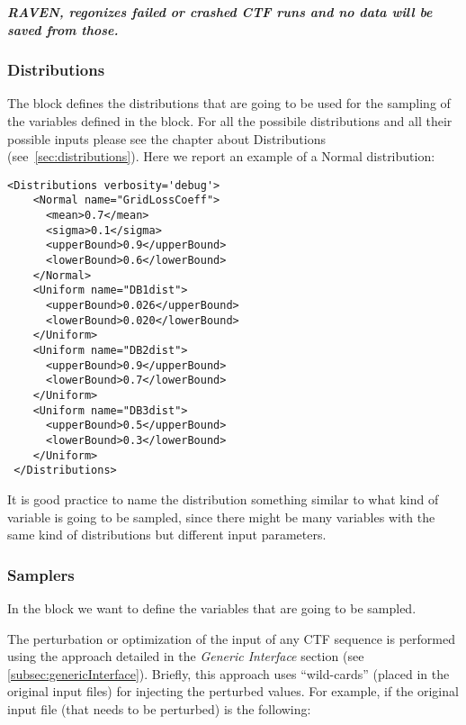 \textbf{\textit{\nb RAVEN, regonizes failed or crashed CTF runs and no data will be saved from those.}}

\subsubsection{Distributions}
The  block defines the distributions that are going
to be used for the sampling of the variables defined in the  block.
%
For all the possibile distributions and all their possible inputs please see the
chapter about Distributions (see~\ref{sec:distributions}).
%
Here we report an example of a Normal distribution:

\begin{lstlisting}[style=XML,morekeywords={name,debug}]
<Distributions verbosity='debug'>
    <Normal name="GridLossCoeff">
      <mean>0.7</mean>
      <sigma>0.1</sigma>
      <upperBound>0.9</upperBound>
      <lowerBound>0.6</lowerBound>
    </Normal>
    <Uniform name="DB1dist">
      <upperBound>0.026</upperBound>
      <lowerBound>0.020</lowerBound>
    </Uniform>
    <Uniform name="DB2dist">
      <upperBound>0.9</upperBound>
      <lowerBound>0.7</lowerBound>
    </Uniform>
    <Uniform name="DB3dist">
      <upperBound>0.5</upperBound>
      <lowerBound>0.3</lowerBound>
    </Uniform>
 </Distributions>
\end{lstlisting}

\noindent
It is good practice to name the distribution something similar to what kind of
variable is going to be sampled, since there might be many variables with the
same kind of distributions but different input parameters.

\subsubsection{Samplers}
In the  block we want to define the variables that are going to be sampled.

\noindent The perturbation or optimization of the input of any CTF sequence is performed using the approach detailed in the \textit{Generic Interface} section (see \ref{subsec:genericInterface}). Briefly, this approach uses
 ``wild-cards'' (placed in the original input files) for injecting the perturbed values.
 For example, if the original input file (that needs to be perturbed) is the following:

